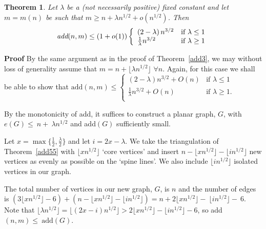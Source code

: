 \documentclass{article}
\newtheorem{Theorem}{Theorem}
\newtheorem{Proof of Theorem}{Proof of Theorem}
\begin{document}
\begin{Theorem} \label{add21}
Let $\lambda$ be a (not necessarily positive) fixed constant and let $m=m(n)$ be such that 
$m \geq n+\lambda n^{1/2} + o(n^{1/2})$. 
Then
\begin{displaymath}
\emph{add}(n,m) \leq (1+o(1))
\left\{ \begin{array}{ll}
\left( 2 - \lambda \right) n^{3/2} & \textrm{if } \lambda \leq 1 \\
\frac{1}{ \lambda} n^{3/2} & \textrm{if } \lambda \geq 1 \\
\end{array} \right. 
\end{displaymath}
\end{Theorem}
\textbf{Proof}
By the same argument as in the proof of Theorem~\ref{add3}, 
we may without loss of generality assume that
$m=n + \lfloor \lambda n^{1/2} \rfloor$ $\forall n$.
Again, for this case we shall be able to show that 
$\textrm{add}(n,m) \leq 
\left\{ \begin{array}{ll}
\left( 2 - \lambda \right) n^{3/2} + O(n) & \textrm{if } \lambda \leq 1 \\
\frac{1}{ \lambda} n^{3/2} + O(n) & \textrm{if } \lambda \geq 1. \\
\end{array} \right.$

By the monotonicity of add, it suffices to construct a planar graph, $G$,
with $e(G) \leq~n +~ \lambda n^{1/2}$
and add$(G)$ sufficiently small.

Let $x= \max \{ \frac{1}{2}, \frac{\lambda}{2} \}$ and let $i=2x- \lambda$.
We take the triangulation of Theorem~\ref{add55} with $\lfloor xn^{1/2} \rfloor$ `core vertices'
and insert $n - \lfloor xn^{1/2} \rfloor - \lfloor in^{1/2} \rfloor$ 
new vertices as evenly as possible on the `spine lines'.
We also include $\lfloor in^{1/2} \rfloor$ isolated vertices in our graph.

The total number of vertices in our new graph, $G$, is $n$ 
and the number of edges is 
$(3 \lfloor x n^{1/2} \rfloor - 6) + (n - \lfloor x n^{1/2} \rfloor - \lfloor i n^{1/2} \rfloor)
= n + 2\lfloor x n^{1/2} \rfloor -~\lfloor i n^{1/2} \rfloor -~6$.
Note that 
$\lfloor \lambda n^{1/2} \rfloor = \lfloor (2x-i) n^{1/2} \rfloor > 
2 \lfloor x n^{1/2} \rfloor - \lfloor in^{1/2} \rfloor - 6$, 
so
add$(n,m) \leq~\textrm{add}(G)$.
\end{document}
